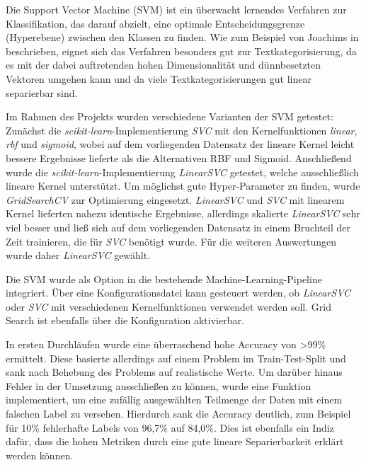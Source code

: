 Die Support Vector Machine (SVM) ist ein überwacht lernendes Verfahren zur Klassifikation, das darauf abzielt, eine optimale Entscheidungsgrenze (Hyperebene) zwischen den Klassen zu finden. Wie zum Beispiel von Joachims in \cite{textCategorizationWithSVM} beschrieben, eignet sich das Verfahren besonders gut zur Textkategorisierung, da es mit der dabei auftretenden hohen Dimensionalität und dünnbesetzten Vektoren umgehen kann und da viele Textkategorisierungen gut linear separierbar sind.

Im Rahmen des Projekts wurden verschiedene Varianten der SVM getestet: Zunächst die \textit{scikit-learn}-Implementierung \textit{SVC} mit den Kernelfunktionen \textit{linear}, \textit{rbf} und \textit{sigmoid}, wobei auf dem vorliegenden Datensatz der lineare Kernel leicht bessere Ergebnisse lieferte als die Alternativen RBF und Sigmoid. Anschließend wurde die \textit{scikit-learn}-Implementierung \textit{LinearSVC} getestet, welche ausschließlich lineare Kernel unterstützt.  Um möglichst gute Hyper-Parameter zu finden, wurde \textit{GridSearchCV} zur Optimierung eingesetzt. \textit{LinearSVC} und \textit{SVC} mit linearem Kernel lieferten nahezu identische Ergebnisse, allerdings skalierte \textit{LinearSVC} sehr viel besser und ließ sich auf dem vorliegenden Datensatz in einem Bruchteil der Zeit trainieren, die für \textit{SVC} benötigt wurde. Für die weiteren Auswertungen wurde daher \textit{LinearSVC} gewählt.

Die SVM wurde als Option in die bestehende Machine-Learning-Pipeline integriert. Über eine Konfigurationsdatei kann gesteuert werden, ob \textit{LinearSVC} oder \textit{SVC} mit verschiedenen Kernelfunktionen verwendet werden soll. Grid Search ist ebenfalls über die Konfiguration aktivierbar.

In ersten Durchläufen wurde eine überraschend hohe Accuracy von >99\% ermittelt. Diese basierte allerdings auf einem Problem im Train-Test-Split und sank nach Behebung des Problems auf realistische Werte. Um darüber hinaus Fehler in der Umsetzung ausschließen zu können, wurde eine Funktion implementiert, um eine zufällig ausgewählten Teilmenge der Daten mit einem falschen Label zu versehen. Hierdurch sank die Accuracy deutlich, zum Beispiel für 10\% fehlerhafte Labels von 96,7\% auf 84,0\%. Dies ist ebenfalls ein Indiz dafür, dass die hohen Metriken durch eine gute lineare Separierbarkeit erklärt werden können.

